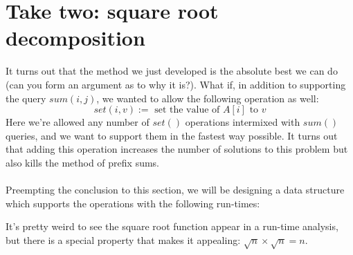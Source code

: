 \documentclass[11pt]{article}
\theoremstyle{plain}
\theoremstyle{definition}
\begin{document}
\section{Take two: square root decomposition}
It turns out that the method we just developed is the absolute best we can do (can you form an argument as to why it is?). What if, in addition to supporting the query $sum(i, j)$, we wanted to allow the following operation as well: $$\boxed{set(i, v) :=\text{ set the value of }A[i]  \text{ to } v}$$
Here we're allowed any number of $set()$ operations intermixed with $sum()$ queries, and we want to support them in the fastest way possible. It turns out that adding this operation increases the number of solutions to this problem but also kills the method of prefix sums. \\\\ Preempting the conclusion to this section, we will be designing a data structure which supports the operations with the following run-times:
\begin{center}
\end{center}
It's pretty weird to see the square root function appear in a run-time analysis, but there is a special property that makes it appealing: $\sqrt{n} \times \sqrt{n} = n$.
\end{document}

